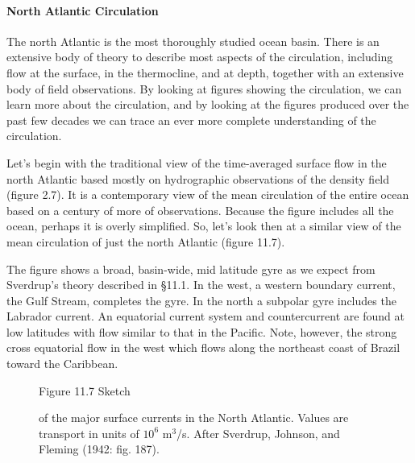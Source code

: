 \paragraph{North Atlantic Circulation}
The north Atlantic is the most
thoroughly studied ocean basin. There is an extensive body of theory
to describe most aspects of the circulation, including flow at the
surface, in the thermocline, and
at depth, together with an extensive body of field observations. By
looking at figures showing the circulation, we can learn more about
the circulation, and by looking at the figures produced over the past
few decades we can trace an ever more complete understanding of the
circulation.

Let's begin with the traditional view of the time-averaged surface
flow in the north Atlantic based mostly on hydrographic
observations
of the density field (figure 2.7). It is a contemporary view of the
mean circulation of the entire ocean based on a century of more of
observations. Because the figure includes all the ocean, perhaps it is
overly simplified. So, let's look then at a similar view of the mean
circulation of just the north Atlantic (figure 11.7).

The figure shows a broad, basin-wide, mid latitude gyre as we expect
from Sverdrup's theory described in \S 11.1. In the west, a western
boundary current, the Gulf Stream, completes the gyre. In the north a subpolar gyre
includes the Labrador current. An equatorial current system and
countercurrent are found at low latitudes with flow similar to that in
the Pacific. Note, however, the strong cross equatorial flow in the
west which flows along the northeast coast of Brazil toward the
Caribbean.

\begin{figure}[t!]
\centering
\footnotesize
Figure 11.7 Sketch \rule{0mm}{3ex}of the major surface currents in the
North Atlantic. Values are transport in units of $10^6$ m$^3$/s. After Sverdrup, Johnson, and
Fleming (1942: fig. 187).

\label{fig:NAtlcur1}
\vspace{-4ex}
\end{figure}

